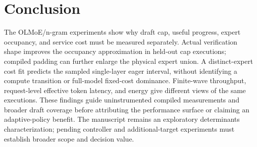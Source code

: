 \documentclass[10pt,twocolumn]{article}
\begin{document}
\section{Conclusion}
The OLMoE/n-gram experiments show why draft cap, useful progress, expert occupancy, and service cost must be measured separately. Actual verification shape improves the occupancy approximation in held-out cap executions; compiled padding can further enlarge the physical expert union. A distinct-expert cost fit predicts the sampled single-layer eager interval, without identifying a compute transition or full-model fixed-cost dominance. Finite-wave throughput, request-level effective token latency, and energy give different views of the same executions. These findings guide uninstrumented compiled measurements and broader draft coverage before attributing the performance surface or claiming an adaptive-policy benefit. The manuscript remains an exploratory determinants characterization; pending controller and additional-target experiments must establish broader scope and decision value.

\begingroup\small


\endgroup
\end{document}
